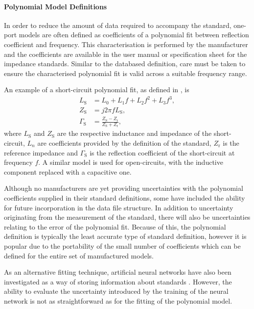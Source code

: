 \documentclass[../thesis/thesis.tex]{subfiles}
\begin{document}
\paragraph{Polynomial Model Definitions}

In order to reduce the amount of data required to accompany the standard, one-port models are often defined as coefficients of a polynomial fit between reflection coefficient and frequency. This characterisation is performed by the manufacturer and the coefficients are available in the user manual or specification sheet for the impedance standards. Similar to the databased definition, care must be taken to ensure the characterised polynomial fit is valid across a suitable frequency range.

An example of a short-circuit polynomial fit, as defined in \cite{Keysight_2016}, is
\begin{align}
	L_\textrm{S} &= L_0 + L_1f + L_2f^2 + L_3f^3, \\
	Z_\textrm{S} &= j2\pi fL_\textrm{S}, \\
	\Gamma_\textrm{S} &= \frac{Z_\textrm{S} - Z_\textrm{r}}{Z_\textrm{S} + Z_\textrm{r}},
\end{align}
where $L_\textrm{S}$ and $Z_\textrm{S}$ are the respective inductance and impedance of the short-circuit, $L_n$ are coefficients provided by the definition of the standard,  $Z_\textrm{r}$ is the reference impedance and $\Gamma_\textrm{S}$ is the reflection coefficient of the short-circuit at frequency $f$. A similar model is used for open-circuits, with the inductive component replaced with a capacitive one.

Although no manufacturers are yet providing uncertainties with the polynomial coefficients supplied in their standard definitions, some have included the ability for future incorporation in the data file structure. In addition to uncertainty originating from the measurement of the standard, there will also be uncertainties relating to the error of the polynomial fit. Because of this, the polynomial definition is typically the least accurate type of standard definition, however it is popular due to the portability of the small number of coefficients which can be defined for the entire set of manufactured models.

As an alternative fitting technique, artificial neural networks have also been investigated as a way of storing information about standards \cite{Jargon_2002}. However, the ability to evaluate the uncertainty introduced by the training of the neural network is not as straightforward as for the fitting of the polynomial model.
\end{document}
